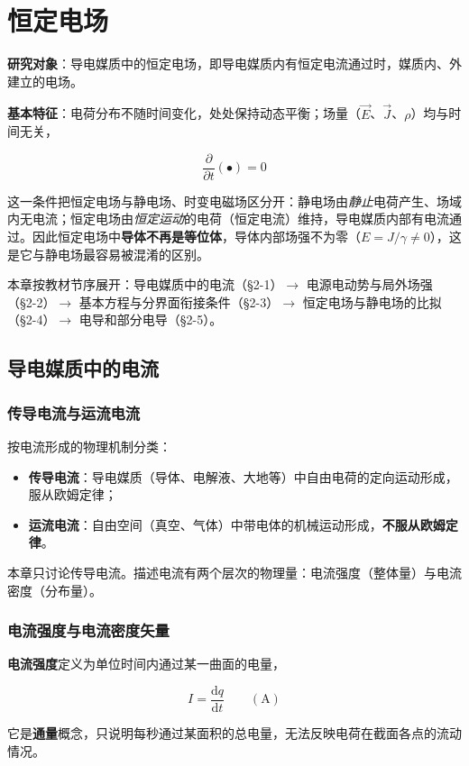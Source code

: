 ﻿%

\chapter{恒定电场}

\textbf{研究对象}：导电媒质中的恒定电场，即导电媒质内有恒定电流通过时，媒质内、外建立的电场。

\textbf{基本特征}：电荷分布不随时间变化，处处保持动态平衡；场量（$\vec{E}$、$\vec{J}$、$\rho$）均与时间无关，
\begin{formulaBox}
\[
\frac{\partial}{\partial t}(\bullet)=0
\]
\end{formulaBox}
这一条件把恒定电场与静电场、时变电磁场区分开：静电场由\emph{静止}电荷产生、场域内无电流；恒定电场由\emph{恒定运动}的电荷（恒定电流）维持，导电媒质内部有电流通过。因此恒定电场中\textbf{导体不再是等位体}，导体内部场强不为零（$E=J/\gamma \neq 0$），这是它与静电场最容易被混淆的区别。

本章按教材节序展开：导电媒质中的电流（\S2-1）$\to$ 电源电动势与局外场强（\S2-2）$\to$ 基本方程与分界面衔接条件（\S2-3）$\to$ 恒定电场与静电场的比拟（\S2-4）$\to$ 电导和部分电导（\S2-5）。

\section{导电媒质中的电流}

\subsection{传导电流与运流电流}
按电流形成的物理机制分类：
\begin{itemize}
  \item \textbf{传导电流}：导电媒质（导体、电解液、大地等）中自由电荷的定向运动形成，服从欧姆定律；
  \item \textbf{运流电流}：自由空间（真空、气体）中带电体的机械运动形成，\textbf{不服从欧姆定律}。
\end{itemize}
本章只讨论传导电流。描述电流有两个层次的物理量：电流强度（整体量）与电流密度（分布量）。

\subsection{电流强度与电流密度矢量}
\textbf{电流强度}定义为单位时间内通过某一曲面的电量，
\begin{formulaBox}
\[
I=\frac{\mathrm{d}q}{\mathrm{d}t}\qquad(\mathrm{A})
\]
\end{formulaBox}
它是\textbf{通量}概念，只说明每秒通过某面积的总电量，无法反映电荷在截面各点的流动情况。

